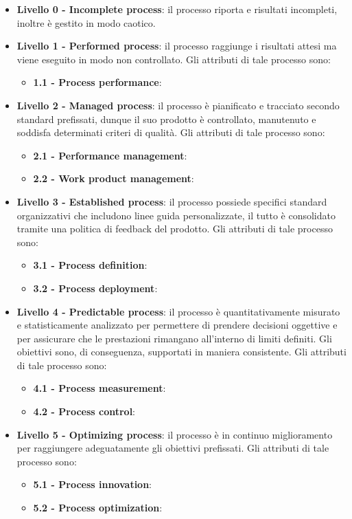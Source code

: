 	\begin{itemize}
	\item \textbf {Livello 0 - Incomplete process}: il processo riporta  e risultati incompleti, inoltre è gestito in modo caotico.
	\item \textbf {Livello 1 - Performed process}:  il processo raggiunge i risultati attesi ma viene eseguito in modo non controllato. Gli attributi di tale processo sono:
		\begin{itemize}
		\item \textbf{1.1 - Process performance}: 
		\end{itemize}
	\item \textbf {Livello 2 - Managed process}: il processo è pianificato e tracciato secondo standard prefissati, dunque il suo prodotto è controllato, manutenuto e soddisfa determinati criteri di qualità. Gli attributi di tale processo sono:
		\begin{itemize}
		\item \textbf{2.1 - Performance management}:
		\item \textbf{2.2 - Work product management}:
		\end{itemize}
	\item \textbf {Livello 3 - Established process}: il processo possiede specifici standard organizzativi che includono linee guida personalizzate, il tutto è consolidato tramite una politica di feedback del prodotto. Gli attributi di tale processo sono:
		\begin{itemize}
		\item \textbf{3.1 - Process definition}:
		\item \textbf{3.2 - Process deployment}:
		\end{itemize}
	\item \textbf {Livello 4 - Predictable process}: il processo è quantitativamente misurato e statisticamente analizzato per permettere di prendere decisioni oggettive e per assicurare che le prestazioni rimangano all'interno di limiti definiti. Gli obiettivi sono, di conseguenza, supportati in maniera consistente. Gli attributi di tale processo sono:
		\begin{itemize}
		\item \textbf{4.1 - Process measurement}:
		\item \textbf{4.2 - Process control}:
		\end{itemize}
	\item \textbf {Livello 5 - Optimizing process}: il processo è in continuo miglioramento per raggiungere adeguatamente gli obiettivi prefissati. Gli attributi di tale processo sono:
		\begin{itemize}
		\item \textbf{5.1 - Process innovation}:
		\item \textbf{5.2 - Process optimization}:
		\end{itemize}
	\end{itemize}
	

